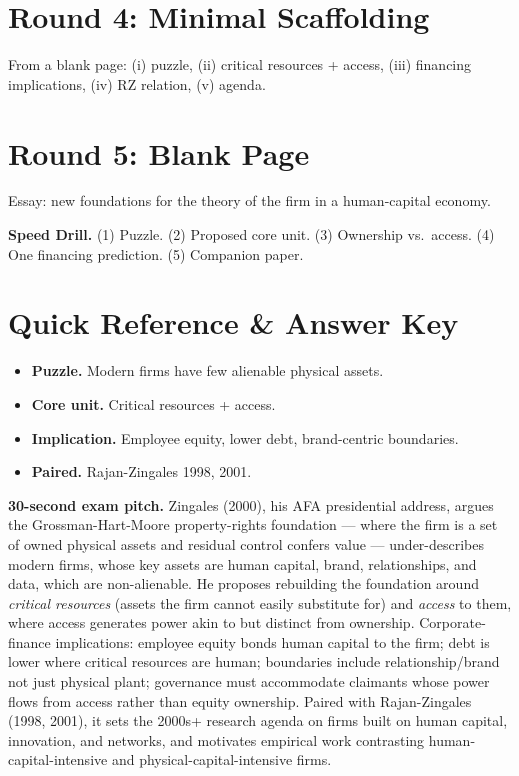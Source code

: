 \documentclass[11pt]{article}
\begin{document}
\section*{Round 4: Minimal Scaffolding}
From a blank page: (i) puzzle, (ii) critical resources + access, (iii) financing implications, (iv) RZ relation, (v) agenda.

\section*{Round 5: Blank Page}
Essay: new foundations for the theory of the firm in a human-capital economy.

\vspace{6pt}
\begin{drillbox}
\textbf{Speed Drill.} (1) Puzzle. (2) Proposed core unit. (3) Ownership vs.\ access. (4) One financing prediction. (5) Companion paper.
\end{drillbox}

\section*{Quick Reference \& Answer Key}
\begin{answerbox}
\begin{itemize}
\item \textbf{Puzzle.} Modern firms have few alienable physical assets.
\item \textbf{Core unit.} Critical resources + access.
\item \textbf{Implication.} Employee equity, lower debt, brand-centric boundaries.
\item \textbf{Paired.} Rajan-Zingales 1998, 2001.
\end{itemize}
\end{answerbox}

\begin{keybox}
\textbf{30-second exam pitch.} Zingales (2000), his AFA presidential address, argues the Grossman-Hart-Moore property-rights foundation --- where the firm is a set of owned physical assets and residual control confers value --- under-describes modern firms, whose key assets are human capital, brand, relationships, and data, which are non-alienable. He proposes rebuilding the foundation around \emph{critical resources} (assets the firm cannot easily substitute for) and \emph{access} to them, where access generates power akin to but distinct from ownership. Corporate-finance implications: employee equity bonds human capital to the firm; debt is lower where critical resources are human; boundaries include relationship/brand not just physical plant; governance must accommodate claimants whose power flows from access rather than equity ownership. Paired with Rajan-Zingales (1998, 2001), it sets the 2000s+ research agenda on firms built on human capital, innovation, and networks, and motivates empirical work contrasting human-capital-intensive and physical-capital-intensive firms.
\end{keybox}
\end{document}
